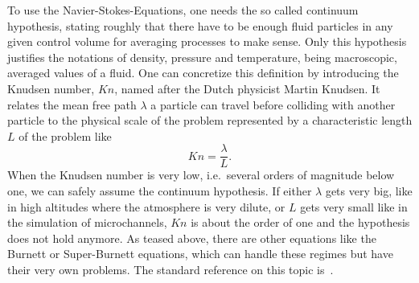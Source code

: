 To use the Navier-Stokes-Equations, one needs the so called continuum hypothesis, stating roughly that there have to be enough fluid particles in any given control volume for averaging processes to make sense. Only this hypothesis justifies the notations of density, pressure and temperature, being macroscopic, averaged values of a fluid.
One can concretize this definition by introducing the Knudsen number, $Kn$, named after the Dutch physicist Martin Knudsen. It relates the mean free path $\lambda$ a particle can travel before colliding with another particle to the physical scale of the problem represented by a characteristic length $L$ of the problem like
\begin{equation}
  Kn=\frac{\lambda}{L}.
\end{equation}
When the Knudsen number is very low, i.e.\ several orders of magnitude below one, we can safely assume the continuum hypothesis. If either $\lambda$ gets very big, like in high altitudes where the atmosphere is very dilute, or $L$ gets very small like in the simulation of microchannels, $Kn$ is about the order of one and the hypothesis does not hold anymore. As teased above, there are other equations like the Burnett or Super-Burnett equations, which can handle these regimes but have their very own problems. The standard reference on this topic is~\cite{agarwal2001beyond}.
